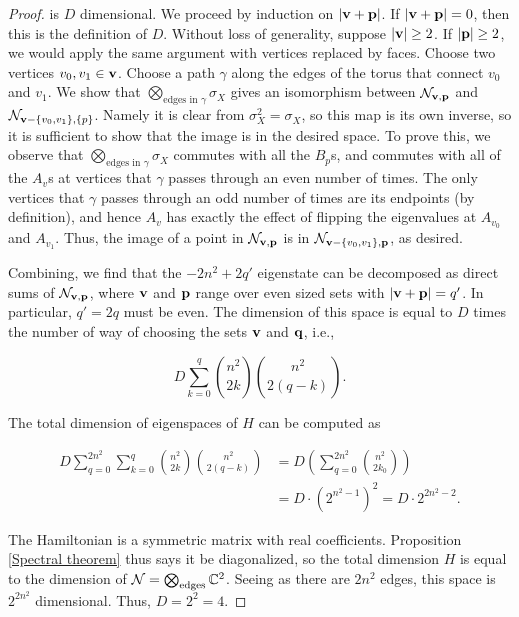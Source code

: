 \documentclass{article}
\theoremstyle{definition}
\numberwithin{figure}{section}
\begin{document}
\begin{proof}
is $D$ dimensional. We proceed by induction on $|\bold{v}+\bold{p}|$. If $|\bold{v}+\bold{p}|=0$, then this is the definition of $D$. Without loss of generality, suppose $|\bold{v}|\geq 2$. If $|\bold{p}|\geq 2$, we would apply the same argument with vertices replaced by faces. Choose two vertices $v_0,v_1\in \bold{v}$. Choose a path $\gamma$ along the edges of the torus that connect $v_0$ and $v_1$. We show that $\bigotimes_{\text{edges in }\gamma}\sigma_X$ gives an isomorphism between $\mathcal{N}_{\bold{v},\bold{p}}$ and $\mathcal{N}_{\bold{v}-\{v_0,v_1\},\{p\}}$. Namely it is clear from $\sigma_X^2=\sigma_X$, so this map is its own inverse, so it is sufficient to show that the image is in the desired space. To prove this, we observe that $\bigotimes_{\text{edges in }\gamma}\sigma_X$ commutes with all the $B_p$s, and commutes with all of the $A_v$s at vertices that $\gamma$ passes through an even number of times. The only vertices that $\gamma$ passes through an odd number of times are its endpoints (by definition), and hence $A_v$ has exactly the effect of flipping the eigenvalues at $A_{v_0}$ and $A_{v_1}$. Thus, the image of a point in $\mathcal{N}_{\bold{v},\bold{p}}$ is in $\mathcal{N}_{\bold{v}-\{v_0,v_1\},\bold{p}}$, as desired.

Combining, we find that the $-2n^2+2q'$ eigenstate can be decomposed as direct sums of $\mathcal{N}_{\bold{v},\bold{p}}$, where $\bold{v}$ and $\bold{p}$ range over even sized sets with $|\bold{v}+\bold{p}|=q'$. In particular, $q'=2q$ must be even. The dimension of this space is equal to $D$ times the number of way of choosing the sets $\bold{v}$ and $\bold{q}$, i.e.,

$$D\sum_{k=0}^{q}{n^2 \choose 2k}{n^2 \choose 2(q-k)}.$$

The total dimension of eigenspaces of $H$ can be computed as

\begin{align*}
D\sum_{q=0}^{2n^2}\sum_{k=0}^{q}{n^2 \choose 2k}{n^2 \choose 2(q-k)}&=D\left(\sum_{q=0}^{2n^2}{n^2 \choose 2k_0}\right)\\
&=D\cdot \left(2^{n^2-1}\right)^2=D\cdot 2^{2n^2-2}.
\end{align*}

The Hamiltonian is a symmetric matrix with real coefficients. Proposition \ref{Spectral theorem} thus says it be diagonalized, so the total dimension $H$ is equal to the dimension of $\mathcal{N}=\bigotimes_{\text{edges}}\mathbb{C}^2$. Seeing as there are $2n^2$ edges, this space is $2^{2n^2}$ dimensional. Thus, $D=2^2=4$.
\end{proof}
\end{document}
